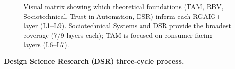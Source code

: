 \begin{figure}[!htbp]
{%
}%
\caption[Theory--Layer Coverage Matrix]{Visual matrix showing which theoretical foundations (TAM, RBV, Sociotechnical, Trust in Automation, DSR) inform each RGAIG+ layer (L1--L9). Sociotechnical Systems and DSR provide the broadest coverage (7/9 layers each); TAM is focused on consumer-facing layers (L6--L7).}
\label{fig:rgaig_theory_layer_matrix_alt}
\end{figure}

\noindent\textbf{Design Science Research (DSR) three-cycle process.}

